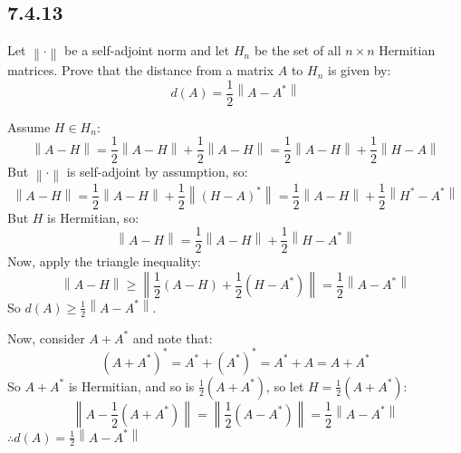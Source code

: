 \documentclass[letterpaper,12pt,fleqn]{article}
\newcommand{\norm}[1]{\left\lVert#1\right\rVert}
\begin{document}
\subsection*{7.4.13}

Let $\norm{\cdot}$ be a self-adjoint norm and let $H_n$ be the set of all $n\times n$
Hermitian matrices. Prove that the distance from a matrix $A$ to $H_n$ is given by:
\[d(A)=\frac{1}{2}\norm{A-A^*}\]

Assume $H\in H_n$:
\[\norm{A-H}=\frac{1}{2}\norm{A-H}+\frac{1}{2}\norm{A-H}=
\frac{1}{2}\norm{A-H}+\frac{1}{2}\norm{H-A}\]
But $\norm{\cdot}$ is self-adjoint by assumption, so:
\[\norm{A-H}=\frac{1}{2}\norm{A-H}+\frac{1}{2}\norm{(H-A)^*}=
\frac{1}{2}\norm{A-H}+\frac{1}{2}\norm{H^*-A^*}\]
But $H$ is Hermitian, so:
\[\norm{A-H}=\frac{1}{2}\norm{A-H}+\frac{1}{2}\norm{H-A^*}\]
Now, apply the triangle inequality:
\[\norm{A-H}\ge\norm{\frac{1}{2}(A-H)+\frac{1}{2}(H-A^*)}=\frac{1}{2}\norm{A-A^*}\]
So $d(A)\ge\frac{1}{2}\norm{A-A^*}$.

Now, consider $A+A^*$ and note that:
\[(A+A^*)^*=A^*+(A^*)^*=A^*+A=A+A^*\]
So $A+A^*$ is Hermitian, and so is $\frac{1}{2}(A+A^*)$, so let $H=\frac{1}{2}(A+A^*)$:
\[\norm{A-\frac{1}{2}(A+A^*)}=\norm{\frac{1}{2}(A-A^*)}=\frac{1}{2}\norm{A-A^*}\]
$\therefore d(A)=\frac{1}{2}\norm{A-A^*}$
\end{document}
